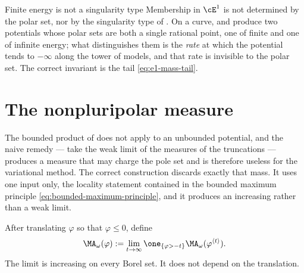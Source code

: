 \begin{warning}{Finite energy is not a singularity type}
Membership in \(\cE^1\) is not determined by the polar set, nor by the
singularity type of .  On a curve,
 and
 produce two potentials whose polar sets are
both a single rational point, one of finite and one of infinite energy; what
distinguishes them is the \emph{rate} at which the potential tends to
\(-\infty\) along the tower of models, and that rate is invisible to the
polar set.  The correct invariant is the tail
\eqref{eq:e1-mass-tail}.
\end{warning}

\section{The nonpluripolar measure}
\label{sec:ch26-nonpluripolar}

The bounded product of  does not apply to an
unbounded potential, and the naive remedy --- take the weak limit of the
measures of the truncations --- produces a measure that may charge the pole
set and is therefore useless for the variational method.  The correct
construction discards exactly that mass.  It uses one input only, the
locality statement contained in the bounded maximum principle
\eqref{eq:bounded-maximum-principle}, and it produces an increasing rather
than a weak limit.

\begin{definition}
\label{def:nonpluripolar-ma}
After translating \(\varphi\) so that \(\varphi\leq0\), define
\begin{equation}
\label{eq:nonpluripolar-ma}
 \MA_\omega(\varphi)
 :=\lim_{t\to\infty}
 \one_{\{\varphi>-t\}}
 \MA_\omega(\varphi^{\langle t\rangle}).
\end{equation}
The limit is increasing on every Borel set. It does not depend on the
translation.
\end{definition}

